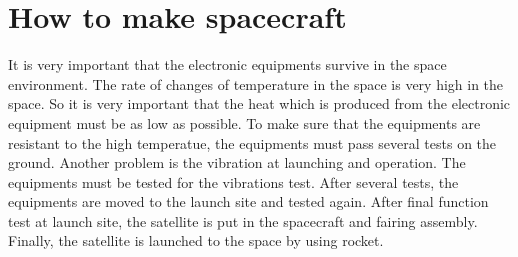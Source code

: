 \section*{How to make spacecraft}
It is very important that the electronic equipments survive in the space environment. The rate of changes of temperature in the space is very high in the space. So it is very important that the heat which is produced from the electronic equipment must be as low as possible. To make sure that the equipments are resistant to the high temperatue, the equipments must pass several tests on the ground. Another problem is the vibration at launching and operation. The equipments must be tested for the vibrations test. After several tests, the equipments are moved to the launch site and tested again. After final function test at launch site, the satellite is put in the spacecraft and fairing assembly. Finally, the satellite is launched to the space by using rocket\cite{lecture}.



